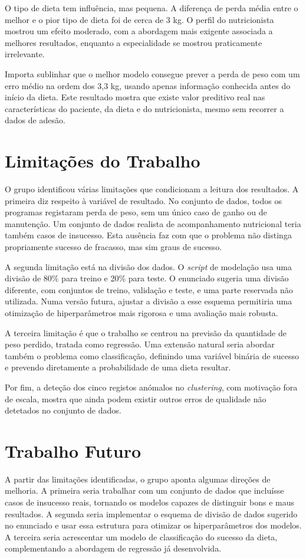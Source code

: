 O tipo de dieta tem influência, mas pequena. A diferença de perda média entre o melhor e o pior tipo de dieta foi de cerca de 3 kg. O perfil do nutricionista mostrou um efeito moderado, com a abordagem mais exigente associada a melhores resultados, enquanto a especialidade se mostrou praticamente irrelevante.

Importa sublinhar que o melhor modelo consegue prever a perda de peso com um erro médio na ordem dos 3,3 kg, usando apenas informação conhecida antes do início da dieta. Este resultado mostra que existe valor preditivo real nas características do paciente, da dieta e do nutricionista, mesmo sem recorrer a dados de adesão.

\section{Limitações do Trabalho}
O grupo identificou várias limitações que condicionam a leitura dos resultados. A primeira diz respeito à variável de resultado. No conjunto de dados, todos os programas registaram perda de peso, sem um único caso de ganho ou de manutenção. Um conjunto de dados realista de acompanhamento nutricional teria também casos de insucesso. Esta ausência faz com que o problema não distinga propriamente sucesso de fracasso, mas sim graus de sucesso.

A segunda limitação está na divisão dos dados. O \textit{script} de modelação usa uma divisão de 80\% para treino e 20\% para teste. O enunciado sugeria uma divisão diferente, com conjuntos de treino, validação e teste, e uma parte reservada não utilizada. Numa versão futura, ajustar a divisão a esse esquema permitiria uma otimização de hiperparâmetros mais rigorosa e uma avaliação mais robusta.

A terceira limitação é que o trabalho se centrou na previsão da quantidade de peso perdido, tratada como regressão. Uma extensão natural seria abordar também o problema como classificação, definindo uma variável binária de sucesso e prevendo diretamente a probabilidade de uma dieta resultar.

Por fim, a deteção dos cinco registos anómalos no \textit{clustering}, com motivação fora de escala, mostra que ainda podem existir outros erros de qualidade não detetados no conjunto de dados.

\section{Trabalho Futuro}
A partir das limitações identificadas, o grupo aponta algumas direções de melhoria. A primeira seria trabalhar com um conjunto de dados que incluísse casos de insucesso reais, tornando os modelos capazes de distinguir bons e maus resultados. A segunda seria implementar o esquema de divisão de dados sugerido no enunciado e usar essa estrutura para otimizar os hiperparâmetros dos modelos. A terceira seria acrescentar um modelo de classificação do sucesso da dieta, complementando a abordagem de regressão já desenvolvida.

